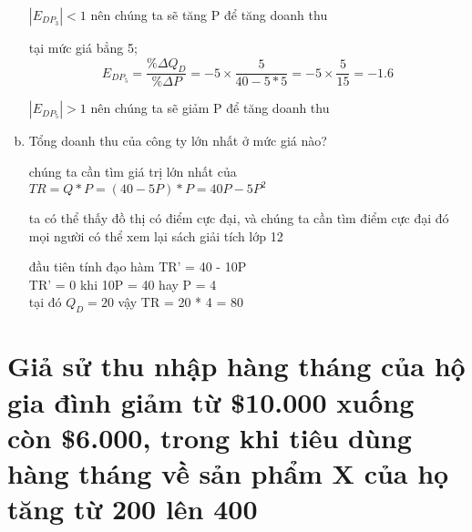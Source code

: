 \begin{enumerate}[a.]
        $|E_{DP_3}| < 1$ nên chúng ta sẽ tăng P để tăng doanh thu

        tại mức giá bẳng 5;
        \[ E_{DP_5} = \frac{\%\Delta Q_D}{\%\Delta P} = -5 \times \frac{5}{40 - 5 * 5}
          = -5 \times \frac{5}{15} = -1.6 \]

        $|E_{DP_5}| > 1$ nên chúng ta sẽ giảm P để tăng doanh thu




  \item Tổng doanh thu của công ty lớn nhất ở mức giá nào?

        chúng ta cần tìm giá trị lớn nhất của $TR = Q * P = (40 - 5P) * P = 40P - 5P^2$


        ta có thể thấy đồ thị có điểm cực đại, và chúng ta cần tìm điểm cực đại đó
        mọi người có thể xem lại sách giải tích lớp 12

        đầu tiên tính đạo hàm TR' = 40 - 10P \\
        TR' = 0 khi 10P = 40 hay P = 4 \\
        tại đó $Q_D = 20$ vậy TR = 20 * 4 = 80



\end{enumerate}

\section{ Giả sử thu nhập hàng tháng của hộ gia đình giảm từ \$10.000 xuống còn \$6.000,
  trong khi tiêu dùng hàng tháng về sản phẩm X của họ tăng từ 200 lên 400}

